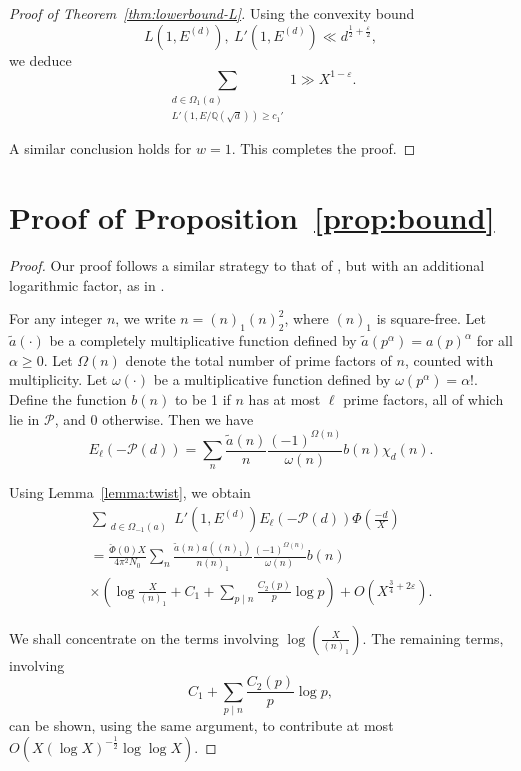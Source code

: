 \documentclass[12pt,reqno]{amsart}
\numberwithin{equation}{section}
\theoremstyle{plain}
\theoremstyle{definition}
\theoremstyle{remark}
\begin{document}
\begin{proof}[Proof of Theorem~\ref{thm:lowerbound-L}]
Using the convexity bound
\[
L(1, E^{(d)}),~ L'(1, E^{(d)})
\ll d^{\frac{1}{2} + \frac{\varepsilon}{2}},
\]
we deduce
\[
\sum_{\substack{d \in \Omega_1(a) \\ L'(1, E/\mathbb{Q}(\sqrt{d})) \geq c_1'}} 1
\gg X^{1 - \varepsilon}.
\]

A similar conclusion holds for \( w = 1 \). This completes the proof.
\end{proof}

\section{Proof of Proposition~\ref{prop:bound}}
\begin{proof}
Our proof follows a similar strategy to that of \cite[Proposition~5]{RadziwillSoundararajan2015},
but with an additional logarithmic factor, as in \cite{GaoZhao2024}.

For any integer $n$, we write $n = (n)_1 (n)_2^2$,
where $(n)_1$ is square-free.
Let $\tilde{a}(\cdot)$ be a completely multiplicative function defined by $
\tilde{a}(p^\alpha) = a(p)^{\alpha}$ for all $\alpha \geq 0$.
Let $\Omega(n)$ denote the total number of prime factors of $n$, counted with multiplicity.
Let $\omega(\cdot)$ be a multiplicative function defined by $\omega(p^\alpha) = \alpha !$.
Define the function $b(n)$ to be 1 if $n$ has at most $\ell$ prime factors, all of which lie in $\mathcal{P}$, and 0 otherwise.
Then we have
\begin{equation*}
  E_{\ell}(-\mathcal{P}(d))
  =
  \sum_{n}
  \frac{\tilde{a}(n)}{n}
 \frac{(-1)^{\Omega(n)}}{\omega(n)}
 b(n) \chi_d(n).
\end{equation*}

Using Lemma~\ref{lemma:twist}, we obtain
\begin{multline*}
\sum_{\substack{d \in \Omega_{-1}(a)}}
L'(1, E^{(d)})
E_{\ell}(-\mathcal{P}(d))
\Phi\left(\frac{-d}{X}\right)
\\=
\frac{ \check{\Phi}(0) X }{4\pi^2 N_0}
\sum_{n}
\frac{\tilde{a}(n) a((n)_1)}{n (n)_1}
 \frac{(-1)^{\Omega(n)}}{\omega(n)}
 b(n)
\\ \times \left( \log \frac{X}{(n)_1} + C_1 +
\sum_{p \mid n} \frac{C_2(p)}{p} \log p \right)
+ O\left(X^{\frac{3}{4} + 2\varepsilon}\right).
\end{multline*}

We shall concentrate on the terms involving
\(\log\left(\frac{X}{(n)_1}\right)\). The remaining terms, involving
\[
C_1 + \sum_{p \mid n} \frac{C_2(p)}{p} \log p,
\]
can be shown, using the same argument, to contribute
at most \( O\left(X (\log X)^{-\frac{1}{2}}\log\log X\right)\).


\end{proof}
\end{document}
